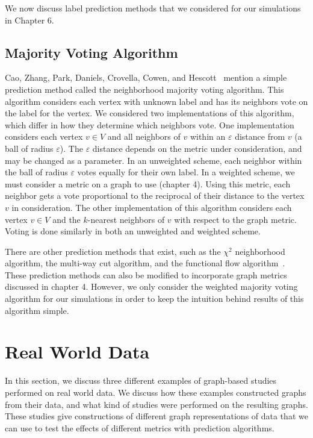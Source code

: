 We now discuss label prediction methods that we considered for our 
simulations in Chapter 6.

\subsection{Majority Voting Algorithm}
Cao, Zhang, Park, Daniels, Crovella, Cowen, and Hescott~\cite{10.1371/journal.pone.0076339}
mention a simple prediction method called the neighborhood majority voting
algorithm. This algorithm considers each vertex with unknown label and has
its neighbors vote on the label for the vertex. We considered two
implementations of this algorithm, which differ in how they determine which neighbors vote. One 
implementation considers each vertex $v \in V$ and all neighbors of $v$ within an $\varepsilon$
distance from $v$ (a ball of radius $\varepsilon$). The $\varepsilon$ distance depends on the metric
under consideration, and may be changed as a parameter. In an unweighted scheme, each neighbor
within the ball of radius $\varepsilon$ votes equally for their own label. In 
a weighted scheme, we must consider a metric on a graph to use (chapter 4).
Using this metric, each neighbor gets a vote proportional to the reciprocal 
of their distance to the vertex $v$ in
consideration. The other implementation of this algorithm considers each vertex $v \in V$ and
the $k$-nearest neighbors of $v$ with respect to the graph metric. Voting is done similarly in both an unweighted and weighted
scheme.

There are other prediction methods that exist, such as the $\chi^{2}$ neighborhood algorithm, the
multi-way cut algorithm, and the functional flow algorithm~\cite{10.1371/journal.pone.0076339}.
These prediction methods can also be modified to incorporate graph metrics discussed in chapter 4.
However, we only consider the weighted majority voting algorithm for our simulations in order to
keep the intuition behind results of this algorithm simple.

\section{Real World Data}

In this section, we discuss three different examples of graph-based studies performed on real world
data. We discuss how these examples constructed graphs from their data, and what kind of studies
were performed on the resulting graphs. These studies give constructions of different graph
representations of data that we can use to test the effects of different metrics with prediction
algorithms.

